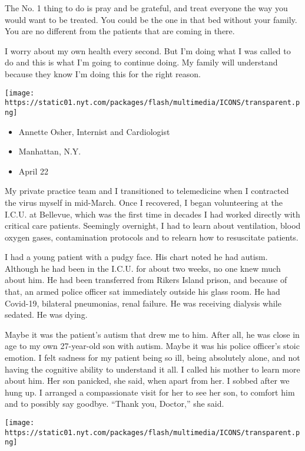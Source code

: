 The No. 1 thing to do is pray and be grateful, and treat everyone the
way you would want to be treated. You could be the one in that bed
without your family. You are no different from the patients that are
coming in there.

I worry about my own health every second. But I'm doing what I was
called to do and this is what I'm going to continue doing. My family
will understand because they know I'm doing this for the right reason.

\texttt{[image: https://static01.nyt.com/packages/flash/multimedia/ICONS/transparent.png]}

\begin{itemize}
\tightlist
\item
  Annette Osher, Internist and Cardiologist
\item
  Manhattan, N.Y.
\item
  April 22
\end{itemize}

My private practice team and I transitioned to telemedicine when I
contracted the virus myself in mid-March. Once I recovered, I began
volunteering at the I.C.U. at Bellevue, which was the first time in
decades I had worked directly with critical care patients. Seemingly
overnight, I had to learn about ventilation, blood oxygen gases,
contamination protocols and to relearn how to resuscitate patients.

I had a young patient with a pudgy face. His chart noted he had autism.
Although he had been in the I.C.U. for about two weeks, no one knew much
about him. He had been transferred from Rikers Island prison, and
because of that, an armed police officer sat immediately outside his
glass room. He had Covid-19, bilateral pneumonias, renal failure. He was
receiving dialysis while sedated. He was dying.

Maybe it was the patient's autism that drew me to him. After all, he was
close in age to my own 27-year-old son with autism. Maybe it was his
police officer's stoic emotion. I felt sadness for my patient being so
ill, being absolutely alone, and not having the cognitive ability to
understand it all. I called his mother to learn more about him. Her son
panicked, she said, when apart from her. I sobbed after we hung up. I
arranged a compassionate visit for her to see her son, to comfort him
and to possibly say goodbye. ``Thank you, Doctor,'' she said.

\texttt{[image: https://static01.nyt.com/packages/flash/multimedia/ICONS/transparent.png]}


